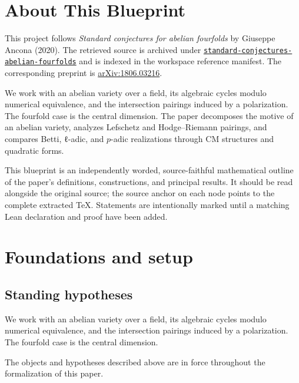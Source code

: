 

\chapter*{About This Blueprint}
\label{standard-conjectures-abelian-fourfolds-about}

This project follows \emph{Standard conjectures for abelian fourfolds} by Giuseppe Ancona (2020). The
retrieved source is archived under
\href{../../../../../references/standard-conjectures-abelian-fourfolds/}{\texttt{standard-conjectures-abelian-fourfolds}} and is indexed in
the workspace reference manifest. The corresponding preprint is
\href{https://arxiv.org/abs/1806.03216}{arXiv:1806.03216}.

We work with an abelian variety over a field, its algebraic cycles modulo numerical equivalence, and the intersection pairings induced by a polarization. The fourfold case is the central dimension. The paper decomposes the motive of an abelian variety, analyzes Lefschetz and Hodge--Riemann pairings, and compares Betti, ℓ-adic, and $p$-adic realizations through CM structures and quadratic forms.

This blueprint is an independently worded, source-faithful mathematical
outline of the paper's definitions, constructions, and principal results. It
should be read alongside the original source; the source anchor on each node
points to the complete extracted TeX. Statements are intentionally marked
\notready until a matching Lean declaration and proof have been added.

\chapter{Foundations and setup}
\label{chap:standard-conjectures-abelian-fourfolds-foundations}

\section{Standing hypotheses}
\label{sec:standard-conjectures-abelian-fourfolds-standing}

We work with an abelian variety over a field, its algebraic cycles modulo numerical equivalence, and the intersection pairings induced by a polarization. The fourfold case is the central dimension.

\begin{convention}
\label{standard-conjectures-abelian-fourfolds-setup}
The objects and hypotheses described above are in force throughout the
formalization of this paper.
\notready
\end{convention}

